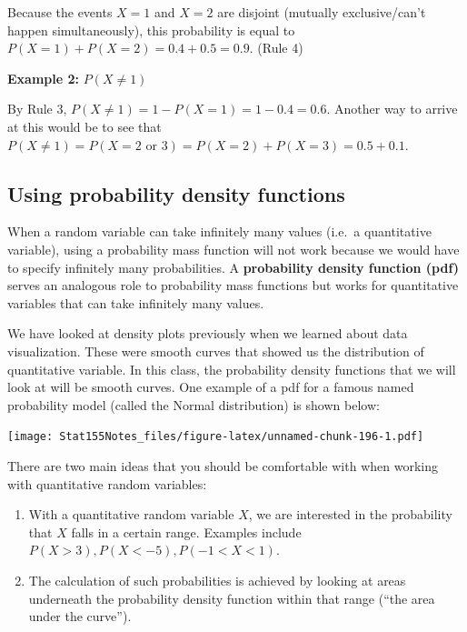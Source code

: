 \documentclass[]{book}
\providecommand{\tightlist}{%
  \setlength{\itemsep}{0pt}\setlength{\parskip}{0pt}}
\begin{document}
Because the events \(X = 1\) and \(X = 2\) are disjoint (mutually exclusive/can't happen simultaneously), this probability is equal to \(P(X = 1) + P(X = 2) = 0.4 + 0.5 = 0.9\). (Rule 4)

\textbf{Example 2:} \(P(X \neq 1)\)

By Rule 3, \(P(X \neq 1) = 1 - P(X = 1) = 1 - 0.4 = 0.6\). Another way to arrive at this would be to see that \(P(X \neq 1) = P(X = 2 \text{ or } 3) = P(X = 2) + P(X = 3) = 0.5 + 0.1\).

\hypertarget{using-probability-density-functions}{%
\subsection{Using probability density functions}\label{using-probability-density-functions}}

When a random variable can take infinitely many values (i.e.~a quantitative variable), using a probability mass function will not work because we would have to specify infinitely many probabilities. A \textbf{probability density function (pdf)} serves an analogous role to probability mass functions but works for quantitative variables that can take infinitely many values.

We have looked at density plots previously when we learned about data visualization. These were smooth curves that showed us the distribution of quantitative variable. In this class, the probability density functions that we will look at will be smooth curves. One example of a pdf for a famous named probability model (called the Normal distribution) is shown below:

\texttt{[image: Stat155Notes\_files/figure-latex/unnamed-chunk-196-1.pdf]}

There are two main ideas that you should be comfortable with when working with quantitative random variables:

\begin{enumerate}
\def\labelenumi{\arabic{enumi}.}
\tightlist
\item
  With a quantitative random variable \(X\), we are interested in the probability that \(X\) falls in a certain range. Examples include \(P(X > 3), P(X < -5), P(-1 < X < 1)\).
\item
  The calculation of such probabilities is achieved by looking at areas underneath the probability density function within that range (``the area under the curve'').
\end{enumerate}
\end{document}
